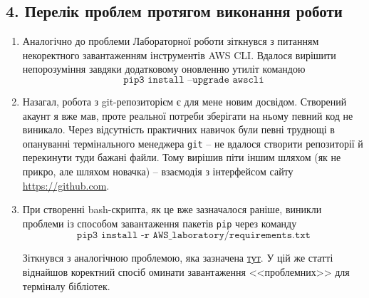 \documentclass[a4paper,14pt]{extarticle} %
\begin{document}
\subsection*{4. Перелік проблем протягом виконання роботи}

\begin{enumerate}
    \item Аналогічно до проблеми Лабораторної роботи  зіткнувся з питанням 
    некоректного завантаженням інструментів AWS CLI. Вдалося вирішити непорозуміння завдяки додатковому
    оновленню утиліт командою
    \[ \texttt{pip3 install --upgrade awscli} \]
    \item Назагал, робота з git-репозиторієм є для мене новим досвідом. Створений акаунт я вже мав, проте 
    реальної потреби зберігати на ньому певний код не виникало. Через відсутність практичних навичок були 
    певні труднощі в опануванні термінального менеджера \texttt{git} -- не вдалося створити репозиторії й 
    перекинути туди бажані файли. Тому вирішив піти іншим шляхом (як не прикро, але шляхом новачка) -- 
    взаємодія з інтерфейсом сайту \url{https://github.com}.
    \item При створенні bash-скрипта, як це вже зазначалося раніше, виникли проблеми із способом завантаження 
    пакетів \texttt{pip} через команду \[ \texttt{pip3 install -r AWS\_laboratory/requirements.txt} \]

    Зіткнувся з аналогічною проблемою, яка зазначена 
    \href{https://stackoverflow.com/questions/44031496/how-to-continue-with-the-instalation-of-the-following-packages-after-an-error}{тут}. 
    У цій же статті віднайшов коректний спосіб оминати завантаження <<проблемних>> для терміналу бібліотек.
\end{enumerate}
\end{document}
